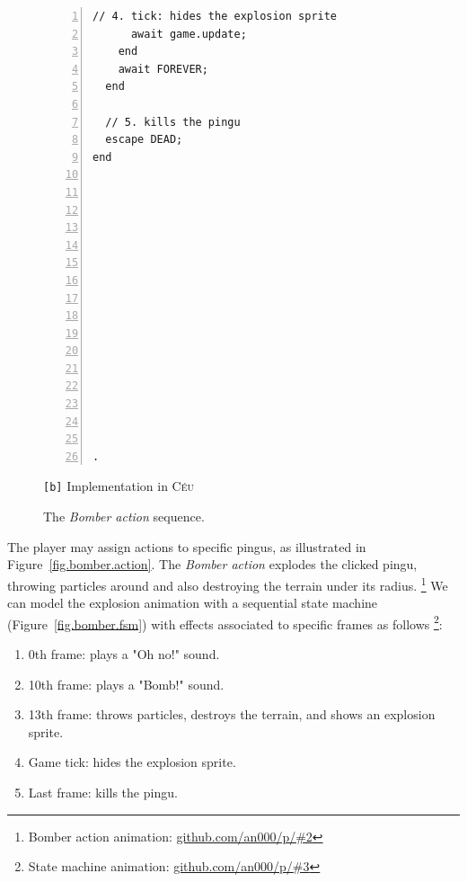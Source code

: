 \documentclass{vgtc}                          %
\newcommand{\CEU}{\textsc{C\'{e}u}\xspace}
\newcommand{\code}[1] {{\small{\texttt{#1}}}}
\newcommand{\bx}{\code{[b]}\xspace}
\begin{document}
\begin{figure}[th!]
\begin{minipage}[t]{0.50\linewidth}
\begin{lstlisting}[numbers=left,xleftmargin=3em]
      // 4. tick: hides the explosion sprite
      await game.update;
    end
    await FOREVER;
  end

  // 5. kills the pingu
  escape DEAD;
end
















.
\end{lstlisting}
\centering\small{\bx Implementation in \CEU}
\end{minipage}
\caption{ The \emph{Bomber action} sequence.
\label{lst.bomber}
}
\end{figure}

The player may assign actions to specific pingus, as illustrated in
Figure~\ref{fig.bomber.action}.
%
The \emph{Bomber action} explodes the clicked pingu, throwing particles around
and also destroying the terrain under its radius.%
\footnote{Bomber action animation: \url{github.com/an000/p/#2} }
%
We can model the explosion animation with a sequential state machine
(Figure~\ref{fig.bomber.fsm}) with effects associated to specific frames as
follows%
\footnote{State machine animation: \url{github.com/an000/p/#3} }:
%
\begin{enumerate}
\item 0th frame:  plays a "Oh no!" sound.
\item 10th frame: plays a "Bomb!" sound.
\item 13th frame: throws particles, destroys the terrain, and shows an
                  explosion sprite.
\item Game tick:  hides the explosion sprite.
\item Last frame: kills the pingu.
\end{enumerate}
\end{document}

